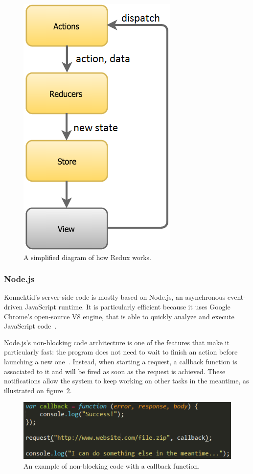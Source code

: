 \begin{figure}[H]
    \centering
    \includegraphics[scale=0.7]{figure/reduxFlow.png}
    \caption{A simplified diagram of how Redux works.}
    \label{fig:reduxSumup}
\end{figure}

\subsubsection{Node.js}
\label{sssec:node}

Konnektid's server-side code is mostly based on Node.js, an asynchronous event-driven JavaScript runtime. It is particularly efficient because it uses Google Chrome's open-source V8 engine, that is able to quickly analyze and execute JavaScript code~\cite{v8}.

Node.js's non-blocking code architecture is one of the features that make it particularly fast: the program does not need to wait to finish an action before launching a new one~\cite{node}. Instead, when starting a request, a callback function is associated to it and will be fired as soon as the request is achieved. These notifications allow the system to keep working on other tasks in the meantime, as illustrated on {\sc figure}~\ref{fig:callback}.

\begin{figure}[H]
    \centering
    \includegraphics[scale=0.8]{figure/callback.png}
    \caption{An example of non-blocking code with a callback function.}
    \label{fig:callback}
\end{figure}

